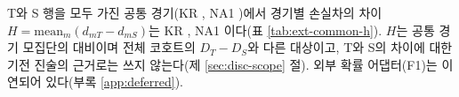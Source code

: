 

T와 S 행을 모두 가진 공통 경기(KR \ebHKRn{}, NA1 \ebHNAn{})에서 경기별 손실차의 차이 $H = \mathrm{mean}_m(d_{mT} - d_{mS})$는 KR \ebHKR{} \ci{\ebHKRLo}{\ebHKRHi}, NA1 \ebHNA{} \ci{\ebHNALo}{\ebHNAHi}이다(표 \ref{tab:ext-common-h}). $H$는 공통 경기 모집단의 대비이며 전체 코호트의 $D_T - D_S$와 다른 대상이고, T와 S의 차이에 대한 기전 진술의 근거로는 쓰지 않는다(제 \ref{sec:disc-scope} 절). 외부 확률 어댑터(F1)는 이연되어 있다(부록 \ref{app:deferred}).


